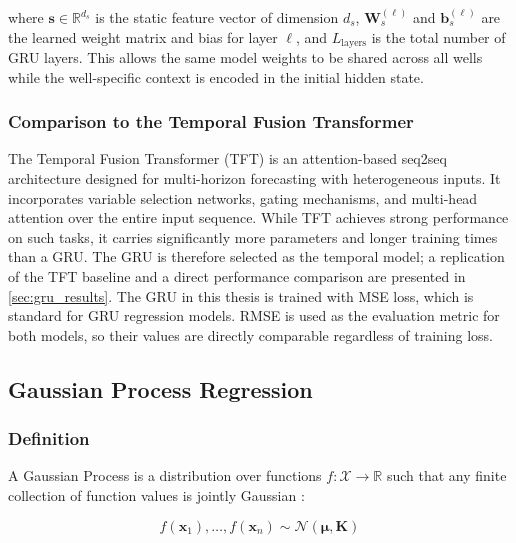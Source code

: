 where $\mathbf{s} \in \mathbb{R}^{d_s}$ is the static feature vector of dimension $d_s$,
$\mathbf{W}_s^{(\ell)}$ and $\mathbf{b}_s^{(\ell)}$ are the learned weight matrix and bias
for layer $\ell$, and $L_\text{layers}$ is the total number of GRU layers. This allows the
same model weights to be shared across all wells while the well-specific context is
encoded in the initial hidden state.

\subsubsection{Comparison to the Temporal Fusion Transformer}

The Temporal Fusion Transformer (TFT) \citep{lim2021temporal} is an attention-based seq2seq
architecture designed for multi-horizon forecasting with heterogeneous inputs. It incorporates
variable selection networks, gating mechanisms, and multi-head attention over the entire input
sequence. While TFT achieves strong performance on such tasks, it carries significantly more
parameters and longer training times than a GRU. The GRU is therefore selected as the
temporal model; a replication of the \citet{kunz2025} TFT baseline and a direct
performance comparison are presented in \cref{sec:gru_results}.
The GRU in this thesis is trained with MSE loss, which is standard for GRU regression models. RMSE is used as the evaluation metric for both models, so their values are directly comparable regardless of training loss.

\subsection{Gaussian Process Regression}
\label{subsec:gp_background}

\subsubsection{Definition}

A Gaussian Process is a distribution over functions $f: \mathcal{X}
\to \mathbb{R}$ such that any finite collection of function values is jointly Gaussian \citep{rasmussen2006gaussian}:

\begin{equation}
  f(\mathbf{x}_1), \ldots, f(\mathbf{x}_n) \sim \mathcal{N}\!\left(\boldsymbol{\mu}, \mathbf{K}\right)
\end{equation}

